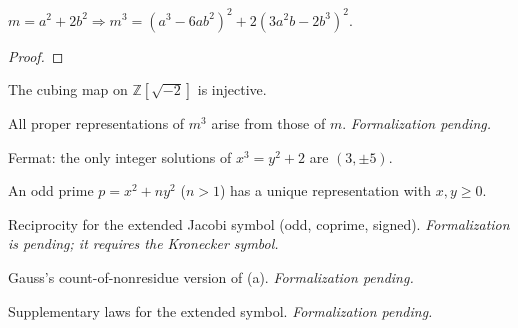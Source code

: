 \begin{theorem}[Exercise 3.21(b)]
  \label{exr:s3_21_b}
  \leanok
  $m=a^2+2b^2 \Rightarrow m^3=(a^3-6ab^2)^2+2(3a^2b-2b^3)^2$.
\end{theorem}
\begin{proof}\leanok\end{proof}

\begin{theorem}[Exercise 3.21(c)]
  \label{exr:s3_21_c}
  \leanok
  The cubing map on $\mathbb Z[\sqrt{-2}]$ is injective.
\end{theorem}

\begin{theorem}[Exercise 3.21(d)]
  \label{exr:s3_21_d}
  \notready
  All proper representations of $m^3$ arise from those of $m$. \emph{Formalization pending.}
\end{theorem}

\begin{theorem}[Exercise 3.22]
  \label{exr:s3_22}
  \leanok
  Fermat: the only integer solutions of $x^3=y^2+2$ are $(3,\pm5)$.
\end{theorem}

\begin{theorem}[Exercise 3.23]
  \label{exr:s3_23}
  \leanok
  An odd prime $p=x^2+ny^2$ ($n>1$) has a unique representation with $x,y\ge0$.
\end{theorem}

\begin{theorem}[Exercise 3.24(a)]
  \label{exr:s3_24_a}
  \notready
  Reciprocity for the extended Jacobi symbol (odd, coprime, signed). \emph{Formalization is
  pending; it requires the Kronecker symbol.}
\end{theorem}

\begin{theorem}[Exercise 3.24(b)]
  \label{exr:s3_24_b}
  \notready
  Gauss's count-of-nonresidue version of (a). \emph{Formalization pending.}
\end{theorem}

\begin{theorem}[Exercise 3.24(c)]
  \label{exr:s3_24_c}
  \notready
  Supplementary laws for the extended symbol. \emph{Formalization pending.}
\end{theorem}


